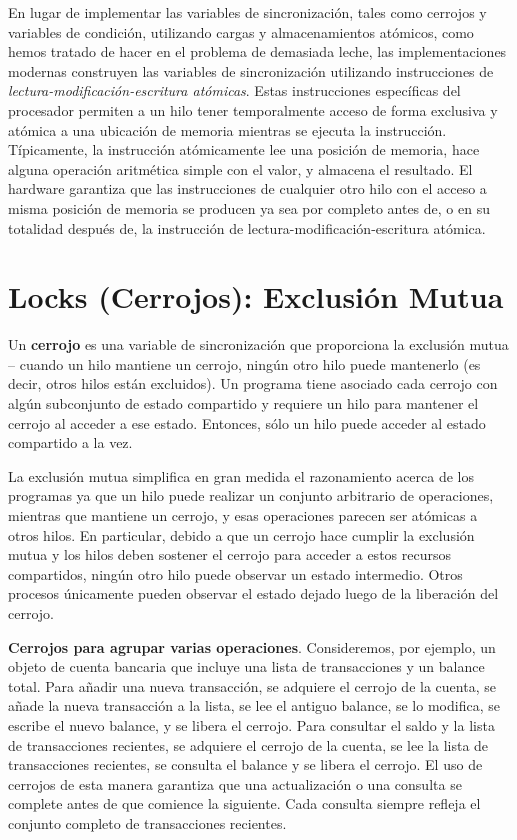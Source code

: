 \documentclass[10pt]{book}
\begin{document}
\begin{itemize}
En lugar de implementar las variables de sincronización, tales como cerrojos y variables de condición, utilizando cargas y almacenamientos atómicos, como hemos tratado de hacer en el problema de demasiada leche, las implementaciones modernas construyen las variables de sincronización utilizando instrucciones de \textit{lectura-modificación-escritura atómicas}. Estas instrucciones específicas del procesador permiten a un hilo tener temporalmente acceso de forma exclusiva y atómica a una ubicación de memoria mientras se ejecuta la instrucción. Típicamente, la instrucción atómicamente lee una posición de memoria, hace alguna operación aritmética simple con el valor, y almacena el resultado. El hardware garantiza que las instrucciones de cualquier otro hilo con el acceso a misma posición de memoria se producen ya sea por completo antes de, o en su totalidad después de, la instrucción de lectura-modificación-escritura atómica.
\end{itemize}


\section{Locks (Cerrojos): Exclusión Mutua}
Un \textbf{cerrojo} es una variable de sincronización que proporciona la exclusión mutua -- cuando un hilo mantiene un cerrojo, ningún otro hilo puede mantenerlo (es decir, otros hilos están excluidos). Un programa tiene asociado cada cerrojo con algún subconjunto de estado compartido y requiere un hilo para mantener el cerrojo al acceder a ese estado. Entonces, sólo un hilo puede acceder al estado compartido a la vez.

La exclusión mutua simplifica en gran medida el razonamiento acerca de los programas ya que un hilo puede realizar un conjunto arbitrario de operaciones, mientras que mantiene un cerrojo, y esas operaciones parecen ser atómicas a otros hilos. En particular, debido a que un cerrojo hace cumplir la exclusión mutua y los hilos deben sostener el cerrojo para acceder a estos recursos compartidos, ningún otro hilo puede observar un estado intermedio. Otros procesos únicamente pueden observar el estado dejado luego de la liberación del cerrojo.

\textbf{Cerrojos para agrupar varias operaciones}. Consideremos, por ejemplo, un objeto de cuenta bancaria que incluye una lista de transacciones y un balance total. Para añadir una nueva transacción, se adquiere el cerrojo de la cuenta, se añade la nueva transacción a la lista, se lee el antiguo balance, se lo modifica, se escribe el nuevo balance, y se libera el cerrojo. Para consultar el saldo y la lista de transacciones recientes, se adquiere el cerrojo de la cuenta, se lee la lista de transacciones recientes, se consulta el balance y se libera el cerrojo. El uso de cerrojos de esta manera garantiza que una actualización o una consulta se complete antes de que comience la siguiente. Cada consulta siempre refleja el conjunto completo de transacciones recientes.
\end{document}
